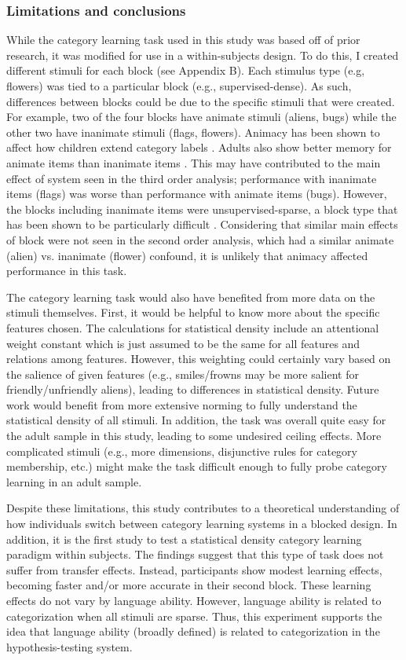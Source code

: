 \documentclass[../dissertation.tex]{subfiles}
\begin{document}
\subsubsection{Limitations and conclusions}

	While the category learning task used in this study was based off of prior research, it was modified for use in a within-subjects design. To do this, I created different stimuli for each block (see Appendix B). Each stimulus type (e.g, flowers) was tied to a particular block (e.g., supervised-dense). As such, differences between blocks could be due to the specific stimuli that were created. For example, two of the four blocks have animate stimuli (aliens, bugs) while the other two have inanimate stimuli (flags, flowers). Animacy has been shown to affect how children extend category labels \citep{Davidson2018}. Adults also show better memory for animate items than inanimate items \citep{Bonin2014}. This may have contributed to the main effect of system seen in the third order analysis; performance with inanimate items (flags) was worse than performance with animate items (bugs). However, the blocks including inanimate items were unsupervised-sparse, a block type that has been shown to be particularly difficult \citep{Kloos2008}. Considering that similar main effects of block were not seen in the second order analysis, which had a similar animate (alien) vs. inanimate (flower) confound, it is unlikely that animacy affected performance in this task. \par 
	The category learning task would also have benefited from more data on the stimuli themselves. First, it would be helpful to know more about the specific features chosen. The calculations for statistical density include an attentional weight constant which is just assumed to be the same for all features and relations among features. However, this weighting could certainly vary based on the salience of given features (e.g., smiles/frowns may be more salient for friendly/unfriendly aliens), leading to differences in statistical density. Future work would benefit from more extensive norming to fully understand the statistical density of all stimuli. In addition, the task was overall quite easy for the adult sample in this study, leading to some undesired ceiling effects. More complicated stimuli (e.g., more dimensions, disjunctive rules for category membership, etc.) might make the task difficult enough to fully probe category learning in an adult sample. \par
	Despite these limitations, this study contributes to a theoretical understanding of how individuals switch between category learning systems in a blocked design. In addition, it is the first study to test a statistical density category learning paradigm within subjects. The findings suggest that this type of task does not suffer from transfer effects. Instead, participants show modest learning effects, becoming faster and/or more accurate in their second block. These learning effects do not vary by language ability. However, language ability is related to categorization when all stimuli are sparse. Thus, this experiment supports the idea that language ability (broadly defined) is related to categorization in the hypothesis-testing system.
	
\end{document}
